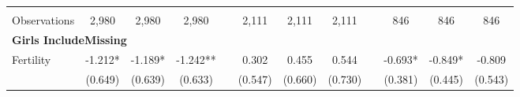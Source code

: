\begin{landscape}
\begin{table}[htpb!]
\begin{center}
\begin{tabular}{lcccp{2mm}cccp{2mm}ccc}
\begin{footnotesize}\end{footnotesize}&\begin{footnotesize}\end{footnotesize}&\begin{footnotesize}\end{footnotesize}&\begin{footnotesize}\end{footnotesize}&\begin{footnotesize}\end{footnotesize}&\begin{footnotesize}\end{footnotesize}&\begin{footnotesize}\end{footnotesize}&\begin{footnotesize}\end{footnotesize}&\begin{footnotesize}\end{footnotesize}&\begin{footnotesize}\end{footnotesize}&\begin{footnotesize}\end{footnotesize}&\begin{footnotesize}\end{footnotesize}\\Observations&2,980&2,980&2,980&&2,111&2,111&2,111&&846&846&846\\
\multicolumn{12}{l}{\textbf{Girls IncludeMissing}}\\ 
Fertility&-1.212*&-1.189*&-1.242**&&0.302&0.455&0.544&&-0.693*&-0.849*&-0.809\\
&(0.649)&(0.639)&(0.633)&&(0.547)&(0.660)&(0.730)&&(0.381)&(0.445)&(0.543)\\

\end{tabular}
\end{center}
\end{table}
\end{landscape}
